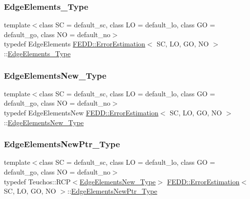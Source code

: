 \subsubsection{\texorpdfstring{Edge\+Elements\+\_\+\+Type}{EdgeElements\_Type}}
{\footnotesize\ttfamily template$<$class SC  = default\+\_\+sc, class LO  = default\+\_\+lo, class GO  = default\+\_\+go, class NO  = default\+\_\+no$>$ \\
typedef Edge\+Elements \hyperlink{classFEDD_1_1ErrorEstimation}{F\+E\+D\+D\+::\+Error\+Estimation}$<$ SC, LO, GO, NO $>$\+::\hyperlink{classFEDD_1_1ErrorEstimation_a8014e1e4844351d77d667159034e7523}{Edge\+Elements\+\_\+\+Type}}

\mbox{\label{classFEDD_1_1ErrorEstimation_a6d88b3605199b28846c71278b7d34838}} 
\subsubsection{\texorpdfstring{Edge\+Elements\+New\+\_\+\+Type}{EdgeElementsNew\_Type}}
{\footnotesize\ttfamily template$<$class SC  = default\+\_\+sc, class LO  = default\+\_\+lo, class GO  = default\+\_\+go, class NO  = default\+\_\+no$>$ \\
typedef Edge\+Elements\+New \hyperlink{classFEDD_1_1ErrorEstimation}{F\+E\+D\+D\+::\+Error\+Estimation}$<$ SC, LO, GO, NO $>$\+::\hyperlink{classFEDD_1_1ErrorEstimation_a6d88b3605199b28846c71278b7d34838}{Edge\+Elements\+New\+\_\+\+Type}}

\mbox{\label{classFEDD_1_1ErrorEstimation_ad3347e220a355c8edda97dd2805bf7ff}} 
\subsubsection{\texorpdfstring{Edge\+Elements\+New\+Ptr\+\_\+\+Type}{EdgeElementsNewPtr\_Type}}
{\footnotesize\ttfamily template$<$class SC  = default\+\_\+sc, class LO  = default\+\_\+lo, class GO  = default\+\_\+go, class NO  = default\+\_\+no$>$ \\
typedef Teuchos\+::\+R\+CP$<$\hyperlink{classFEDD_1_1ErrorEstimation_a6d88b3605199b28846c71278b7d34838}{Edge\+Elements\+New\+\_\+\+Type}$>$ \hyperlink{classFEDD_1_1ErrorEstimation}{F\+E\+D\+D\+::\+Error\+Estimation}$<$ SC, LO, GO, NO $>$\+::\hyperlink{classFEDD_1_1ErrorEstimation_ad3347e220a355c8edda97dd2805bf7ff}{Edge\+Elements\+New\+Ptr\+\_\+\+Type}}

